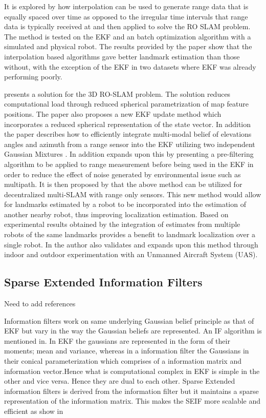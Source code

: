 \documentclass[conference]{IEEEtran}
\begin{document}
	
	
	
	It is explored by \cite{Kehagias2006} how interpolation can be used to generate range data that is equally spaced over time as opposed to the irregular time intervals that range data is typically received at and then applied to solve the RO SLAM problem. The method is tested on the EKF and an batch optimization algorithm with a simulated and physical robot. The results provided by the paper show that the interpolation based algorithms gave better landmark estimation than those without, with the exception of the EKF in two datasets where EKF was already performing poorly.
	
	
	
	
	
	\cite{Fabresse2013} presents a solution for the 3D RO-SLAM problem. The solution reduces computational load through reduced spherical parametrization of map feature positions. The paper also proposes a new EKF update method which incorporates a reduced spherical representation of the state vector. In addition the paper describes how to efficiently integrate multi-modal belief of elevations angles and azimuth from a range sensor into the EKF utilizing two independent Gaussian Mixtures \cite{Fabresse2013}. In addition \cite{Fabresse2014} expands upon this by presenting a pre-filtering algorithm to be applied to range measurement before being used in the EKF in order to reduce the effect of noise generated by environmental issue such as multipath. It is then proposed by \cite{Fabresse2015} that the above method can be utilized for decentralized multi-SLAM with range only sensors. This new method would allow for landmarks estimated by a robot to be incorporated into the estimation of another nearby robot, thus improving localization estimation. Based on experimental results obtained by \cite{Fabresse2015} the integration of estimates from multiple robots of the same landmarks provides a benefit to landmark localization over a single robot. In \cite{Fabresse2016} the author also validates and expands upon this method through indoor and outdoor experimentation with an Unmanned Aircraft System (UAS).  
	
\subsection{Sparse Extended Information Filters}
Need to add references

Information filters work on same underlying Gaussian belief principle as that of EKF but vary in the way the Gaussian beliefs are represented. An IF algorithm is mentioned in\cite{Torres-Gonzalez2014}. In EKF the gaussians are represented in the form of their moments; mean and variance, whereas in a information filter the Gaussians in their conical parameterization which comprises of a information matrix and information vector.Hence what is computational complex in EKF is simple in the other and vice versa. Hence they are dual to each other.
Sparse Extended information filters is derived from the  information filter but it maintains a sparse representation of the information matrix. This makes the SEIF more scalable and efficient as show in\cite{Torres-Gonzalez2014} 
\end{document}
